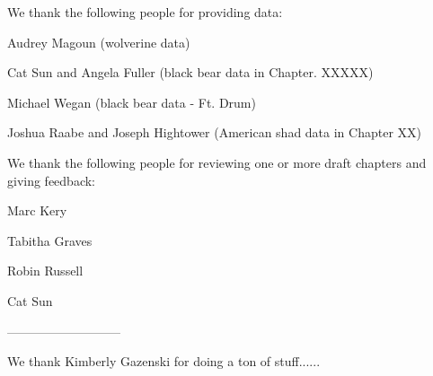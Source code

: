 We thank the following people for providing data:



Audrey Magoun (wolverine data)

Cat Sun and Angela Fuller (black bear data in Chapter. XXXXX)

Michael Wegan (black bear data - Ft. Drum)

Joshua Raabe and Joseph Hightower (American shad data in Chapter XX)




We thank the following people for reviewing one or more draft chapters
and giving feedback:

Marc Kery

Tabitha Graves

Robin Russell

Cat Sun


---------------------------

We thank Kimberly Gazenski for doing a ton of stuff......


